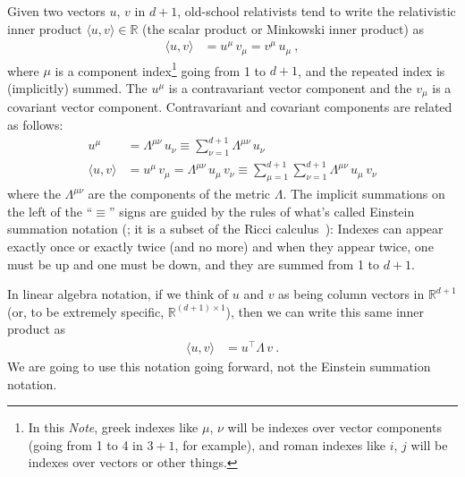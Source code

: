\documentclass{article}
\newcommand{\inner}[2]{\langle{#1},{#2}\rangle}
\newcommand{\documentname}{\textsl{Note}}
\begin{document}
Given two vectors $u$, $v$ in $d+1$, old-school relativists tend to write the relativistic inner product $\inner{u}{v}\in\mathbb{R}$ (the scalar product or Minkowski inner product) as
\begin{align}
    \inner{u}{v} &= u^\mu\,v_\mu = v^\mu\,u_\mu ~,
\end{align}
where $\mu$ is a component index\footnote{In this \documentname{}, greek indexes like $\mu$, $\nu$ will be indexes over vector components (going from 1 to 4 in $3+1$, for example), and roman indexes like $i$, $j$ will be indexes over vectors or other things.} going from 1 to $d+1$, and the repeated index is (implicitly) summed.
The $u^\mu$ is a contravariant vector component and the $v_\mu$ is a covariant vector component.
Contravariant and covariant components are related as follows:
\begin{align}
    u^\mu &= \Lambda^{\mu\nu}\,u_\nu \equiv \sum_{\nu=1}^{d+1} \Lambda^{\mu\nu}\,u_\nu
    \\
    \inner{u}{v} &= u^\mu\,v_\mu = \Lambda^{\mu\nu}\,u_\mu\,v_\nu \equiv \sum_{\mu=1}^{d+1}\sum_{\nu=1}^{d+1} \Lambda^{\mu\nu}\,u_\mu\,v_\nu
\end{align}
where the $\Lambda^{\mu\nu}$ are the components of the metric $\Lambda$.
The implicit summations on the left of the ``$\equiv$'' signs are guided by the rules of what's called Einstein summation notation (\cite{summation}; it is a subset of the Ricci calculus~\cite{ricci}): Indexes can appear exactly once or exactly twice (and no more) and when they appear twice, one must be up and one must be down, and they are summed from 1 to $d+1$.

In linear algebra notation, if we think of $u$ and $v$ as being column vectors in $\mathbb{R}^{d+1}$ (or, to be extremely specific, $\mathbb{R}^{(d+1)\times 1}$), then we can write this same inner product as
\begin{align}
    \inner{u}{v} &= u^\top\Lambda\,v ~.
\end{align}
We are going to use this notation going forward, not the Einstein summation notation.
\end{document}
